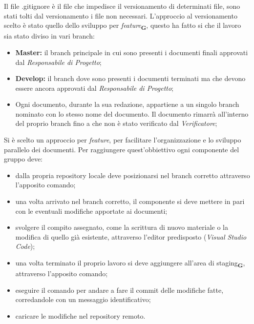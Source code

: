         Il file {\selectfont .gitignore} è il file che impedisce il versionamento di determinati file, sono stati tolti dal versionamento i file non necessari.
        L'approccio al versionamento scelto è stato quello dello sviluppo per \textit{feature}\textsubscript{\textbf{G}}, questo ha fatto si che il lavoro sia stato diviso in vari branch:
        \begin{itemize}
            \item \textbf{Master:} il branch principale in cui sono presenti i documenti finali approvati dal \textit{Responsabile di Progetto};
            \item \textbf{Develop:} il branch dove sono presenti i documenti terminati ma che devono essere ancora approvati dal \textit{Responsabile di Progetto};
            \item Ogni documento, durante la sua redazione, appartiene a un singolo branch nominato con lo stesso nome del documento. Il documento rimarrà all'interno del proprio branch fino a che non è stato verificato dal \textit{Verificatore};
        \end{itemize}
        Si è scelto un approccio per \textit{feature}, per facilitare l'organizzazione e lo sviluppo parallelo dei documenti. Per raggiungere quest'obbiettivo ogni componente del gruppo deve:
        \begin{itemize}
            \item dalla propria repository locale deve posizionarsi nel branch corretto attraverso l'apposito comando;
            \item una volta arrivato nel branch corretto, il componente si deve mettere in pari con le eventuali modifiche apportate ai documenti;
            \item svolgere il compito assegnato, come la scrittura di nuovo materiale o la modifica di quello già esistente, attraverso l'editor predisposto (\textit{Visual Studio Code});
            \item una volta terminato il proprio lavoro si deve aggiungere all'area di staging\textsubscript{\textbf{G}}, attraverso l'apposito comando;
            \item eseguire il comando per andare a fare il commit delle modifiche fatte, corredandole con un messaggio identificativo;
            \item caricare le modifiche nel repository remoto. 
        \end{itemize}
